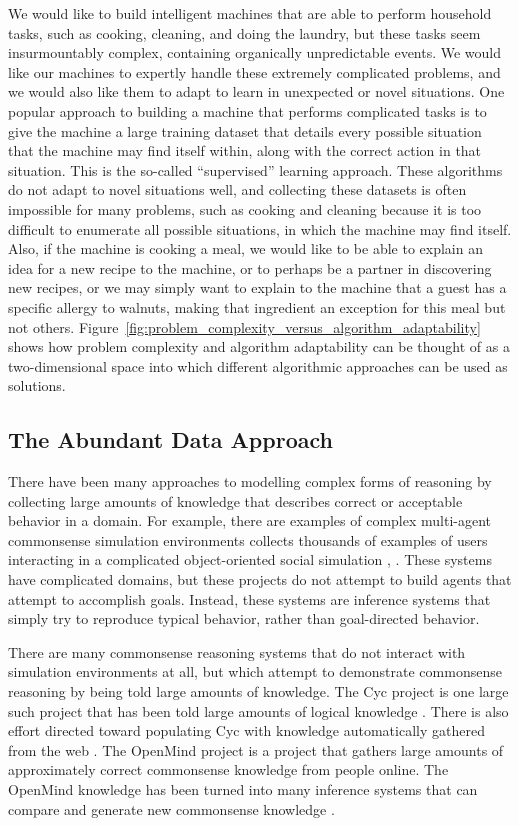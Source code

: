 We would like to build intelligent machines that are able to perform
household tasks, such as cooking, cleaning, and doing the laundry, but
these tasks seem insurmountably complex, containing organically
unpredictable events.  We would like our machines to expertly handle
these extremely complicated problems, and we would also like them to
adapt to learn in unexpected or novel situations.  One popular
approach to building a machine that performs complicated tasks is to
give the machine a large training dataset that details every possible
situation that the machine may find itself within, along with the
correct action in that situation.  This is the so-called
``supervised'' learning approach.  These algorithms do not adapt to
novel situations well, and collecting these datasets is often
impossible for many problems, such as cooking and cleaning because it
is too difficult to enumerate all possible situations, in which the
machine may find itself.  Also, if the machine is cooking a meal, we
would like to be able to explain an idea for a new recipe to the
machine, or to perhaps be a partner in discovering new recipes, or we
may simply want to explain to the machine that a guest has a specific
allergy to walnuts, making that ingredient an exception for this meal
but not others.
Figure~\ref{fig:problem_complexity_versus_algorithm_adaptability}
shows how problem complexity and algorithm adaptability can be thought
of as a two-dimensional space into which different algorithmic
approaches can be used as solutions.

\subsection{The Abundant Data Approach}

There have been many approaches to modelling complex forms of
reasoning by collecting large amounts of knowledge that describes
correct or acceptable behavior in a domain.  For example, there are
examples of complex multi-agent commonsense simulation environments
collects thousands of examples of users interacting in a complicated
object-oriented social simulation \citep{orkin:2009},
\citep{orkin:2010}.  These systems have complicated domains, but these
projects do not attempt to build agents that attempt to accomplish
goals.  Instead, these systems are inference systems that simply try
to reproduce typical behavior, rather than goal-directed behavior.

There are many commonsense reasoning systems that do not interact with
simulation environments at all, but which attempt to demonstrate
commonsense reasoning by being told large amounts of knowledge.  The
Cyc project is one large such project that has been told large amounts
of logical knowledge \citep{lenat:1990}.  There is also effort
directed toward populating Cyc with knowledge automatically gathered
from the web \citep{matuszek:2005}.  The OpenMind project
\citep{singh:2002} is a project that gathers large amounts of
approximately correct commonsense knowledge from people online.  The
OpenMind knowledge has been turned into many inference systems that
can compare and generate new commonsense knowledge \citep{liu:2004a,
  liu:2004b, speer:2008}.

